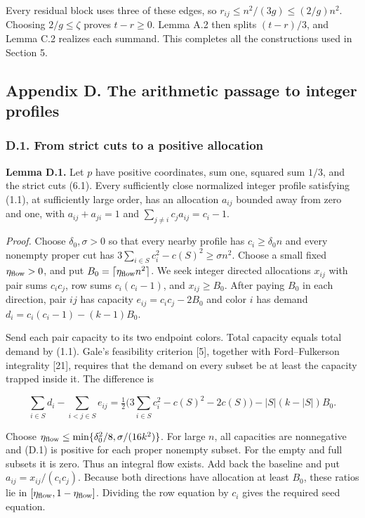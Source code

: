 \documentclass[english,11pt,a4paper]{article}
\newcounter{none}
\begin{document}
Every residual block uses three of these edges, so \(r_{ij}\le n^2/(3g)\le(2/g)n^2\). Choosing \(2/g\le\zeta\) proves \(t-r\ge0\). Lemma A.2 then splits \((t-r)/3\), and Lemma C.2 realizes each summand. This completes all the constructions used in Section 5.

\subsection{Appendix D. The arithmetic passage to integer profiles}\label{appendix-d.-the-arithmetic-passage-to-integer-profiles}

\subsubsection{D.1. From strict cuts to a positive allocation}\label{d.1.-from-strict-cuts-to-a-positive-allocation}

\textbf{Lemma D.1.} Let \(p\) have positive coordinates, sum one, squared sum \(1/3\), and the strict cuts (6.1). Every sufficiently close normalized integer profile satisfying (1.1), at sufficiently large order, has an allocation \(a_{ij}\) bounded away from zero and one, with \(a_{ij}+a_{ji}=1\) and \(\sum_{j\ne i}c_ja_{ij}=c_i-1\).

\emph{Proof.} Choose \(\delta_0,\sigma>0\) so that every nearby profile has \(c_i\ge\delta_0n\) and every nonempty proper cut has \(3\sum_{i\in S}c_i^2-c(S)^2\ge\sigma n^2\). Choose a small fixed \(\eta_{\rm flow}>0\), and put \(B_0=\lceil\eta_{\rm flow} n^2\rceil\). We seek integer directed allocations \(x_{ij}\) with pair sums \(c_ic_j\), row sums \(c_i(c_i-1)\), and \(x_{ij}\ge B_0\). After paying \(B_0\) in each direction, pair \(ij\) has capacity \(e_{ij}=c_ic_j-2B_0\) and color \(i\) has demand \(d_i=c_i(c_i-1)-(k-1)B_0\).

Send each pair capacity to its two endpoint colors. Total capacity equals total demand by (1.1). Gale's feasibility criterion {[}5{]}, together with Ford--Fulkerson integrality {[}21{]}, requires that the demand on every subset be at least the capacity trapped inside it. The difference is

\[\sum_{i\in S}d_i-\sum_{i<j\in S}e_{ij}=\tfrac12\bigl(3\sum_{i\in S}c_i^2-c(S)^2-2c(S)\bigr)-|S|(k-|S|)B_0.\tag{D.1}\]

Choose \(\eta_{\rm flow}\le\min\{\delta_0^2/8,\sigma/(16k^2)\}\). For large \(n\), all capacities are nonnegative and (D.1) is positive for each proper nonempty subset. For the empty and full subsets it is zero. Thus an integral flow exists. Add back the baseline and put \(a_{ij}=x_{ij}/(c_ic_j)\). Because both directions have allocation at least \(B_0\), these ratios lie in \([\eta_{\rm flow},1-\eta_{\rm flow}]\). Dividing the row equation by \(c_i\) gives the required seed equation.
\end{document}
